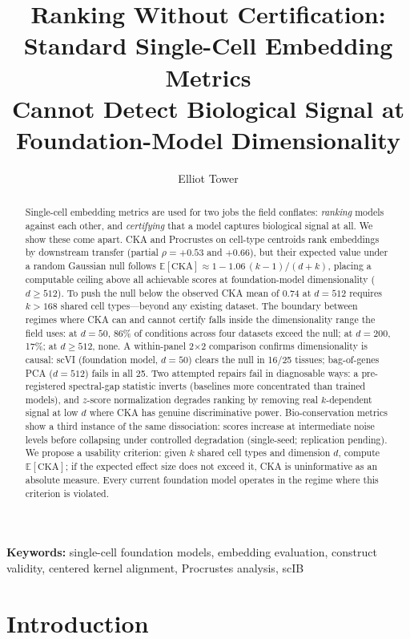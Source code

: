 \documentclass[11pt]{article}
\title{Ranking Without Certification: Standard Single-Cell Embedding Metrics\\
Cannot Detect Biological Signal at Foundation-Model Dimensionality}
\author{Elliot Tower}
\affil{Independent Researcher \\ \texttt{elliot@elliottower.ai}}
\date{}
\begin{document}
\linenumbers
\maketitle

\begin{abstract}
Single-cell embedding metrics are used for two jobs the field conflates:
\emph{ranking} models against each other, and \emph{certifying} that a
model captures biological signal at all. We show these come apart. CKA
and Procrustes on cell-type centroids rank embeddings by downstream
transfer (partial $\rho = +0.53$ and $+0.66$), but their expected value
under a random Gaussian null follows $\mathbb{E}[\mathrm{CKA}] \approx
1 - 1.06\,(k{-}1)/(d{+}k)$, placing a computable ceiling above all
achievable scores at foundation-model dimensionality ($d \geq 512$). To
push the null below the observed CKA mean of 0.74 at $d = 512$ requires
$k > 168$ shared cell types---beyond any existing dataset. The boundary
between regimes where CKA can and cannot certify falls inside the
dimensionality range the field uses: at $d = 50$, 86\% of conditions
across four datasets exceed the null; at $d = 200$, 17\%; at
$d \geq 512$, none. A within-panel 2$\times$2 comparison confirms
dimensionality is causal: scVI (foundation model, $d = 50$) clears the
null in 16/25 tissues; bag-of-genes PCA ($d = 512$) fails in all 25.
Two attempted repairs fail in diagnosable ways: a pre-registered
spectral-gap statistic inverts (baselines more concentrated than trained
models), and $z$-score normalization degrades ranking by removing real
$k$-dependent signal at low $d$ where CKA has genuine discriminative
power. Bio-conservation metrics show a third instance of the same
dissociation: scores increase at intermediate noise levels before
collapsing under controlled degradation (single-seed; replication
pending). We propose a usability criterion: given $k$ shared cell types
and dimension $d$, compute $\mathbb{E}[\mathrm{CKA}]$; if the expected
effect size does not exceed it, CKA is uninformative as an absolute
measure. Every current foundation model operates in the regime where
this criterion is violated.
\end{abstract}

\noindent\textbf{Keywords:} single-cell foundation models, embedding evaluation, construct validity, centered kernel alignment, Procrustes analysis, scIB

\section{Introduction}
\label{sec:intro}
\end{document}
